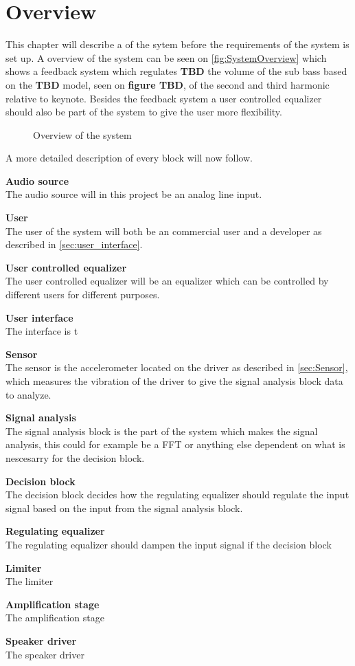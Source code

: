 \chapter{Overview} \label{ch:overview}
This chapter will describe a of the sytem before the requirements of the system is set up. A overview of the system can be seen on \autoref{fig:SystemOverview} which shows a feedback system which regulates \textbf{TBD} the volume of the sub bass based on the \textbf{TBD} model, seen on \textbf{figure TBD}, of the second and third harmonic relative to keynote. Besides the feedback system a user controlled equalizer should also be part of the system to give the user more flexibility.            

\begin{figure}[H]
\centering
{}
\scalebox{0.8}{
}
\caption{Overview of the system}
\label{fig:SystemOverview}
\end{figure}
A more detailed description of every block will now follow.

\textbf{Audio source} \\
The audio source will in this project be an analog line input. 

\textbf{User} \\
The user of the system will both be an commercial user and a developer as described in \autoref{sec:user_interface}. 

\textbf{User controlled equalizer}\\
The user controlled equalizer will be an equalizer which can be controlled by different users for different purposes.

\textbf{User interface} \\
The interface is t 

\textbf{Sensor} \\
The sensor is the accelerometer located on the driver as described in \autoref{sec:Sensor}, which measures the vibration of the driver to give the signal analysis block data to analyze. 

\textbf{Signal analysis} \\
The signal analysis block is the part of the system which makes the signal analysis, this could for example be a FFT or anything else dependent on what is nescesarry for the decision block.

\textbf{Decision block} \\
The decision block decides how the regulating equalizer should regulate the input signal based on the input from the signal analysis block. 

\textbf{Regulating equalizer} \\
The regulating equalizer should dampen the input signal if the decision block 

\textbf{Limiter} \\
The limiter

\textbf{Amplification stage} \\
The amplification stage

\textbf{Speaker driver} \\
The speaker driver

